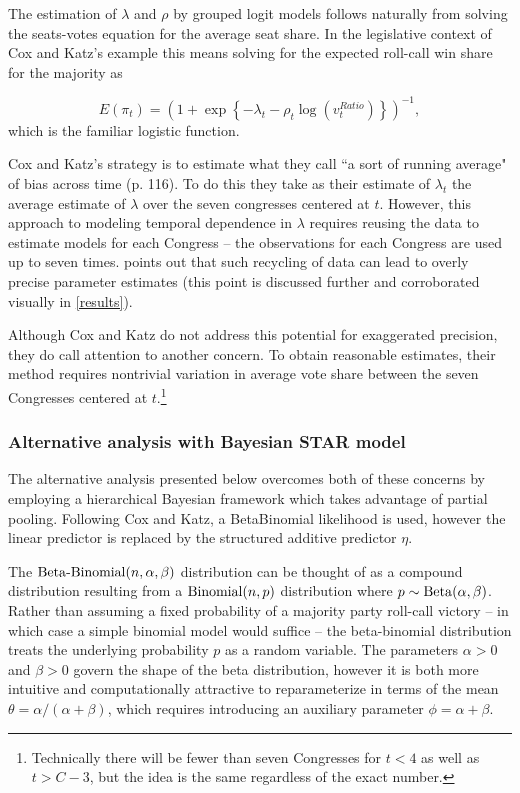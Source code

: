 The estimation of $\lambda$ and $\rho$ by grouped logit models follows naturally from 
solving the seats-votes equation for the average seat share. In the legislative context of 
Cox and Katz's example this means solving for the expected roll-call win share for the 
majority as

\begin{equation*}
  E(\pi_t)  = \left(1 + \exp{\left\{- \lambda_t - \rho_t \log{\left( v_t^{Ratio}  \right)}\right\}}\right)^{-1},
\end{equation*}
%
\noindent which is the familiar logistic function. 

Cox and Katz's strategy is to estimate what they call ``a sort of running average" of bias 
across time (p. 116). To do this they take as their estimate of $\lambda_t$ the average 
estimate of $\lambda$ over the seven congresses centered at $t$. However, this 
approach to modeling temporal dependence in $\lambda$ requires reusing the data 
to estimate models for each Congress -- the observations for each Congress are used 
up to seven times.   points out that such recycling of 
data can lead to overly precise parameter estimates (this point is discussed further and 
corroborated visually in \ref{results}). 

Although Cox and Katz do not address this potential for exaggerated precision, they do 
call attention to another  concern. To obtain reasonable estimates, their method requires 
nontrivial variation in average vote share between the seven Congresses centered at 
$t$.\footnote{Technically there will be fewer than seven Congresses for $t < 4$ as well as 
$t > C- 3$, but the idea is the same regardless of the exact number.}

\subsubsection{Alternative analysis with Bayesian STAR model}
\label{reanalysis}

The alternative analysis presented below overcomes both of these concerns by employing 
a hierarchical Bayesian framework which takes advantage of partial pooling. Following Cox 
and Katz, a BetaBinomial likelihood is used, however the linear predictor is replaced by the 
structured additive predictor $\eta$. 

The ${\rm Beta\text{-}Binomial}(n,\alpha,\beta)$ distribution can be thought of as a compound 
distribution resulting from a ${\rm Binomial}(n,p)$ distribution where $p \sim {\rm Beta}(\alpha,\beta)$. 
Rather than assuming a fixed probability of a majority party roll-call victory -- in which case a simple 
binomial model would suffice -- the beta-binomial distribution treats the underlying probability $p$ 
as a random variable. The parameters $\alpha > 0$ and $\beta > 0$ govern the shape of the beta 
distribution, however it is both more intuitive and computationally attractive to reparameterize in terms 
of the mean $\theta = \alpha / (\alpha + \beta)$, which requires introducing an auxiliary parameter 
$\phi = \alpha + \beta$. 

